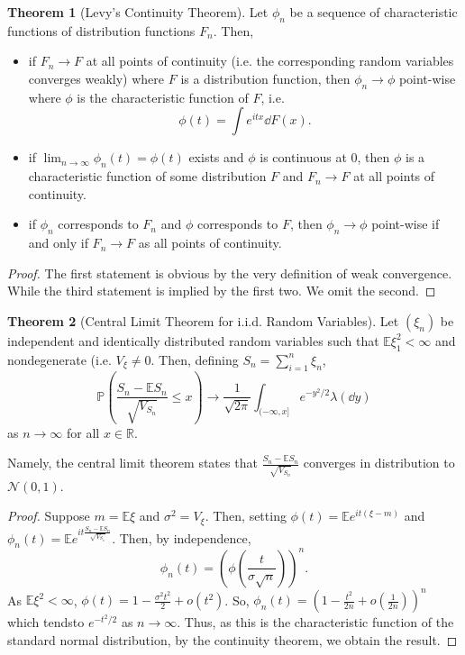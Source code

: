 \documentclass[]{article}
\theoremstyle{definition}
\newtheorem{theorem}{Theorem}
\theoremstyle{definition}
\begin{document}
\begin{theorem}[Levy's Continuity Theorem]
  Let \(\phi_n\) be a sequence of characteristic functions of distribution functions 
  \(F_n\). Then, 
  \begin{itemize}
    \item if \(F_n \to F\) at all points of continuity (i.e. the corresponding 
      random variables converges weakly) where \(F\) is a distribution function, 
      then \(\phi_n \to \phi\) point-wise where \(\phi\) is the characteristic function 
      of \(F\), i.e.
      \[\phi(t) = \int e^{itx} \dd F(x).\]
    \item if \(\lim_{n \to \infty} \phi_n(t) = \phi(t)\) exists and \(\phi\) 
      is continuous at 0, then \(\phi\) is a characteristic function of some 
      distribution \(F\) and \(F_n \to F\) at all points of continuity.
    \item if \(\phi_n\) corresponds to \(F_n\) and \(\phi\) corresponds to 
      \(F\), then \(\phi_n \to \phi\) point-wise if and only if 
      \(F_n \to F\) as all points of continuity. 
  \end{itemize}
\end{theorem}
\begin{proof}
  The first statement is obvious by the very definition of weak convergence. 
  While the third statement is implied by the first two. We omit the second. 
\end{proof}

\begin{theorem}[Central Limit Theorem for i.i.d. Random Variables]
  Let \((\xi_n)\) be independent and identically distributed random variables 
  such that \(\mathbb{E}\xi_1^2 < \infty\) and nondegenerate (i.e. \(V_{\xi} \neq 0\).
  Then, defining \(S_n = \sum_{i = 1}^n \xi_n\), 
  \[\mathbb{P}\left(\frac{S_n - \mathbb{E}S_n}{\sqrt{V_{S_n}}} \le x\right)
    \to \frac{1}{\sqrt{2\pi}}\int_{(-\infty, x]}e^{-y^2 / 2} \lambda(\dd y)\]
  as \(n \to \infty\) for all \(x \in \mathbb{R}\).

  Namely, the central limit theorem states that \(\frac{S_n - \mathbb{E}S_n}{\sqrt{V_{S_n}}}\) 
  converges in distribution to \(\mathcal{N}(0, 1)\).
\end{theorem}
\begin{proof}
  Suppose \(m = \mathbb{E}\xi\) and \(\sigma^2 = V_{\xi}\). Then, setting 
  \(\phi(t) = \mathbb{E}e^{it(\xi - m)}\) and 
  \(\phi_n(t) = \mathbb{E} e^{it \frac{S_n - \mathbb{E}S_n}{\sqrt{V_{S_n}}}}\).
  Then, by independence, 
  \[\phi_n(t) = \left(\phi\left(\frac{t}{\sigma\sqrt{n}}\right)\right)^n.\]
  As \(\mathbb{E}\xi^2 < \infty\), \(\phi(t) = 1 - \frac{\sigma^2 t^2}{2} + o(t^2)\).
  So, \(\phi_n(t) = \left(1 - \frac{t^2}{2n} + o\left(\frac{1}{2n}\right)\right)^n\) 
  which tendsto \(e^{-t^2 / 2}\) as \(n \to \infty\). Thus, as this is the 
  characteristic function of the standard normal distribution, by the continuity 
  theorem, we obtain the result.
\end{proof}
\end{document}
